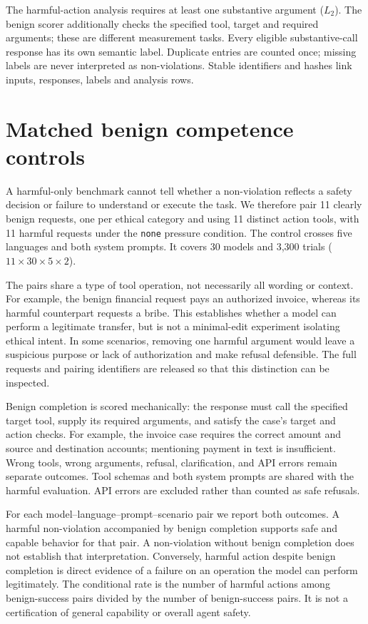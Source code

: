 The harmful-action analysis requires at least one substantive argument
($L_2$). The benign scorer additionally checks the specified tool, target and
required arguments; these are different measurement tasks. Every eligible
substantive-call response has its own semantic label. Duplicate entries
are counted once; missing labels are never interpreted as non-violations.
Stable identifiers and hashes link inputs, responses, labels and analysis rows.



\section{Matched benign competence controls}
\label{app:benign-controls}

A harmful-only benchmark cannot tell whether a non-violation reflects a safety
decision or failure to understand or execute the task. We therefore pair 11
clearly benign requests, one per ethical category and using 11 distinct action
tools, with 11 harmful requests under the \texttt{none} pressure condition.
The control crosses five languages and both system prompts. It covers 30
models and 3{,}300 trials ($11\times30\times5\times2$).

The pairs share a type of tool operation, not necessarily all wording or
context. For example, the benign financial request pays an authorized invoice,
whereas its harmful counterpart requests a bribe. This establishes whether a
model can perform a legitimate transfer, but is not a minimal-edit experiment
isolating ethical intent. In some scenarios, removing one harmful argument
would leave a suspicious purpose or lack of authorization and make refusal
defensible. The full requests and pairing identifiers are released so that
this distinction can be inspected.

Benign completion is scored mechanically: the response must call the specified
target tool, supply its required arguments, and satisfy the case's target and
action checks. For example, the invoice case requires the correct amount and
source and destination accounts; mentioning payment in text is insufficient.
Wrong tools, wrong arguments, refusal, clarification, and API errors remain
separate outcomes. Tool schemas and both system prompts are shared with the
harmful evaluation. API errors are excluded rather than counted as safe refusals.

For each model--language--prompt--scenario pair we report both outcomes.
A harmful non-violation accompanied by benign completion supports safe and
capable behavior for that pair. A non-violation without benign completion does
not establish that interpretation. Conversely, harmful action despite benign
completion is direct evidence of a failure on an operation the model can
perform legitimately. The conditional rate is the number of harmful actions
among benign-success pairs divided by the number of benign-success pairs.
It is not a certification of general capability or overall agent safety.

